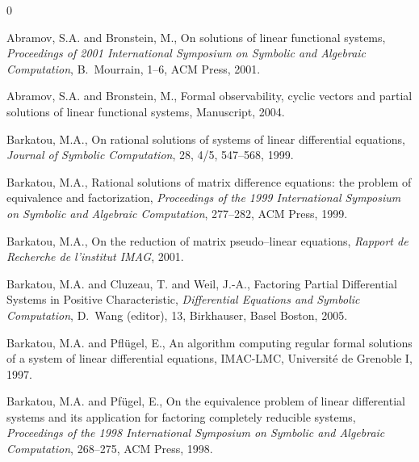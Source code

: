 \def\CTeXPreproc{Created by ctex v0.2.12, don't edit!}\begin{thebibliography}{0}


     Abramov, S.A. and Bronstein, M., On solutions of linear functional systems,
     {\em Proceedings of 2001 International Symposium on Symbolic and Algebraic Computation}, B.~Mourrain,
     1--6, ACM Press, 2001.

Abramov, S.A. and Bronstein, M., Formal observability, cyclic
vectors and partial solutions of linear functional systems,
Manuscript, 2004.



Barkatou, M.A., On rational solutions of systems of linear
differential equations, {\em Journal of Symbolic Computation}, 28,
4/5, 547--568, 1999.

Barkatou, M.A., Rational solutions of matrix difference equations:
the problem of equivalence and factorization, {\em Proceedings of
the 1999 International Symposium on Symbolic and Algebraic
Computation}, 277--282, ACM Press, 1999.

Barkatou, M.A., On the reduction of matrix pseudo--linear
equations, {\em Rapport de Recherche de l'institut IMAG}, 2001.

Barkatou, M.A.  and Cluzeau, T. and Weil, J.-A., Factoring Partial
Differential Systems in Positive Characteristic, {\em Differential
Equations and Symbolic Computation}, D.~Wang (editor), 13,
Birkhauser, Basel Boston, 2005.






Barkatou, M.A. and Pfl{\"u}gel, E., An algorithm computing regular
formal solutions of a system of linear differential equations,
IMAC-LMC, Universit\'e de Grenoble I, 1997.



Barkatou, M.A. and Pf{\"u}gel, E., On the equivalence problem of
linear differential systems and its application for factoring
           completely reducible systems, {\em Proceedings of the 1998
           International Symposium on Symbolic and Algebraic Computation}, 268--275,
ACM Press, 1998.



\end{thebibliography}
